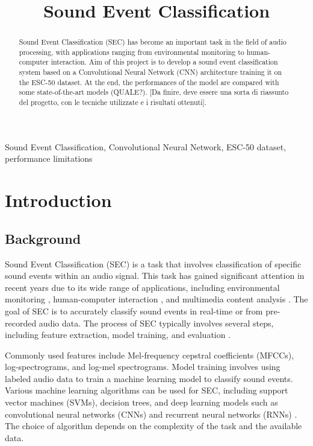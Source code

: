 \documentclass{article}
\title{Sound Event Classification}
\begin{document}
\ninept
\maketitle

\begin{sloppy}

\begin{abstract}
  Sound Event Classification (SEC) has become an important task in the field of
  audio processing, with applications ranging from environmental monitoring to
  human-computer interaction. Aim of this project is to develop a sound event classification system
  based on a Convolutional Neural Network (CNN) architecture training it on the ESC-50 dataset.
  At the end, the performances of the model are compared with some state-of-the-art models (QUALE?).
  [Da finire, deve essere una sorta di riassunto del progetto, con le tecniche utilizzate e i risultati ottenuti].
\end{abstract}

\begin{keywords}
Sound Event Classification, Convolutional Neural Network, ESC-50 dataset, performance limitations
\end{keywords}

\section{Introduction}
\label{sec:intro}

\subsection{Background}
\label{sec:background}
Sound Event Classification (SEC) is a task that involves classification of
specific sound events within an audio signal. This task has gained significant attention in recent years
due to its wide range of applications, including environmental monitoring \cite{birdsCNN2017}, human-computer interaction \cite{emotionRecognition2021},
and multimedia content analysis \cite{kumar2016weaklysupervisedscalableaudio}.
The goal of SEC is to accurately classify sound events in real-time or from pre-recorded audio data.
The process of SEC typically involves several steps, including feature extraction, model training, and evaluation \cite{ReviewSoundEvent2025}.

Commonly used features include Mel-frequency cepstral coefficients (MFCCs), log-spectrograms, and log-mel spectrograms.
Model training involves using labeled audio data to train a machine learning model to classify sound events.
Various machine learning algorithms can be used for SEC, including support vector machines (SVMs), decision trees, and deep
learning models such as convolutional neural networks (CNNs) and recurrent neural networks (RNNs) \cite{DescriptiveESC2022}.
The choice of algorithm depends on the complexity of the task and the available data.


\end{sloppy}
\end{document}
